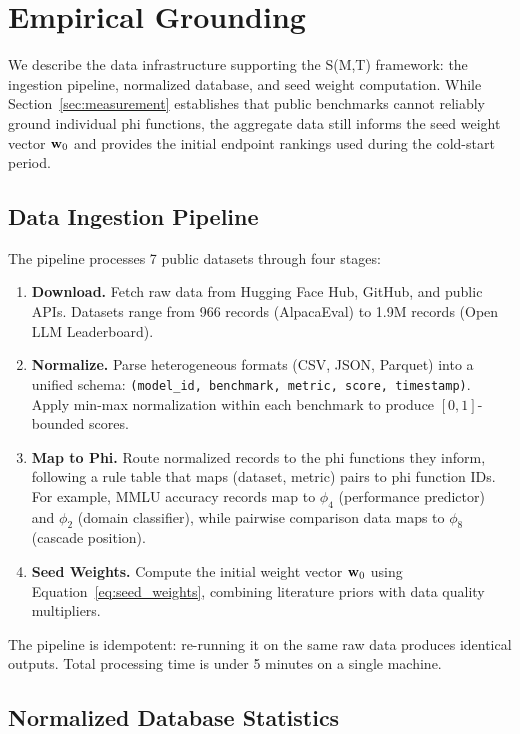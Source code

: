 \section{Empirical Grounding}
\label{sec:empirical}

We describe the data infrastructure supporting the S(M,T) framework: the ingestion pipeline, normalized database, and seed weight computation. While Section~\ref{sec:measurement} establishes that public benchmarks cannot reliably ground individual phi functions, the aggregate data still informs the seed weight vector $\mathbf{w}_0$ and provides the initial endpoint rankings used during the cold-start period.

\subsection{Data Ingestion Pipeline}

The pipeline processes 7 public datasets through four stages:

\begin{enumerate}
    \item \textbf{Download.} Fetch raw data from Hugging Face Hub, GitHub, and public APIs. Datasets range from 966 records (AlpacaEval) to 1.9M records (Open LLM Leaderboard).
    \item \textbf{Normalize.} Parse heterogeneous formats (CSV, JSON, Parquet) into a unified schema: \texttt{(model\_id, benchmark, metric, score, timestamp)}. Apply min-max normalization within each benchmark to produce $[0,1]$-bounded scores.
    \item \textbf{Map to Phi.} Route normalized records to the phi functions they inform, following a rule table that maps (dataset, metric) pairs to phi function IDs. For example, MMLU accuracy records map to $\phi_4$ (performance predictor) and $\phi_2$ (domain classifier), while pairwise comparison data maps to $\phi_8$ (cascade position).
    \item \textbf{Seed Weights.} Compute the initial weight vector $\mathbf{w}_0$ using Equation~\ref{eq:seed_weights}, combining literature priors with data quality multipliers.
\end{enumerate}

The pipeline is idempotent: re-running it on the same raw data produces identical outputs. Total processing time is under 5 minutes on a single machine.

\subsection{Normalized Database Statistics}

